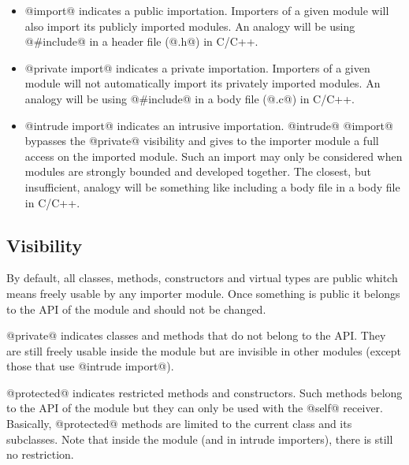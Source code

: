 \begin{itemize}
\item @import@ indicates a public importation.
Importers of a given module will also import its publicly imported modules.
An analogy will be using @#include@ in a header file (@.h@) in C/C++.
\item @private import@ indicates a private importation.
Importers of a given module will not automatically import its privately imported modules.
An analogy will be using @#include@ in a body file (@.c@) in C/C++.
\item @intrude import@ indicates an intrusive importation.
@intrude@ @import@ bypasses the @private@ visibility and gives to the importer module a full access on the imported module.
Such an import may only be considered when modules are strongly bounded and developed together.
The closest, but insufficient, analogy will be something like including a body file in a body file in C/C++.
\end{itemize}

\subsection{Visibility}\label{visibility}

By default, all classes, methods, constructors and virtual types are public whitch means freely usable by any importer module.
Once something is public it belongs to the API of the module and should not be changed.

@private@ indicates classes and methods that do not belong to the API.
They are still freely usable inside the module but are invisible in other modules (except those that use @intrude import@).

@protected@ indicates restricted methods and constructors.
Such methods belong to the API of the module but they can only be used with the @self@ receiver.
Basically, @protected@ methods are limited to the current class and its subclasses.
Note that inside the module (and in intrude importers), there is still no restriction.

